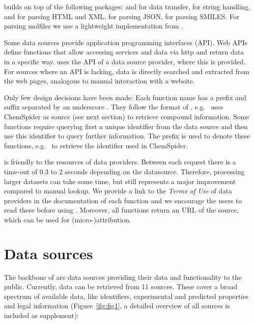 \documentclass[article, shortnames]{jss}\usepackage[]{graphicx}\usepackage[]{color}
\begin{document}
 builds on top of the following  packages:
 \citep{lang_rcurl:_2015} and  \citep{wickham_httr} for data transfer,
 \citep{wickham_stringr:_2015} for string handling,
 \citep{wickham_xml2} and  \citep{wickham_rvest} for parsing HTML and XML,
 \citep{ooms_jsonlite_2014} for parsing JSON,
 \citep{guha_rcdk} for parsing SMILES.
For parsing molfiles we use a lightweight implementation from \citet{Grabner_Varmuza_Dehmer_2012}.

Some data sources provide application programming interfaces (API).
Web APIs define functions that allow accessing services and data via http and return data in a specific way.
 uses the API of a data source provider, where this is provided.
For sources where an API is lacking, data is directly searched and extracted from the web pages, analogous to manual interaction with a website.

Only few design decisions have been made:
Each function name has a prefix and suffix separated by an underscore \citep{Chamberlain_Szocs_2013}.
They follow the format of , e.g.\  uses ChemSpider as source (see next section) to retrieve compound information.
Some functions require querying first a unique identifier from the data source and then use this identifier to query further information.
The prefix  is used to denote these functions, e.g.\  to retrieve the identifier used in ChemSpider.

 is friendly to the resources of data providers. 
Between each request there is a time-out of 0.3 to 2 seconds depending on the datasource. 
Therefore, processing larger datasets can take some time, but still represents a major improvement compared to manual lookup.
We provide a link to the \emph{Terms of Use} of data providers in the documentation of each function and we encourage the users to read these before using .
Moreover, all functions return an URL of the source, which can be used for \mbox{(micro-)attribution}.


\section[Data sources]{Data sources}
The backbone of  are data sources providing their data and functionality to the public.
Currently, data can be retrieved from 11 sources.
These cover a broad spectrum of available data, like identifiers, experimental and predicted properties and legal information (Figure~\ref{fig:fig1}, a detailed overview of all sources is included as supplement):
\end{document}
